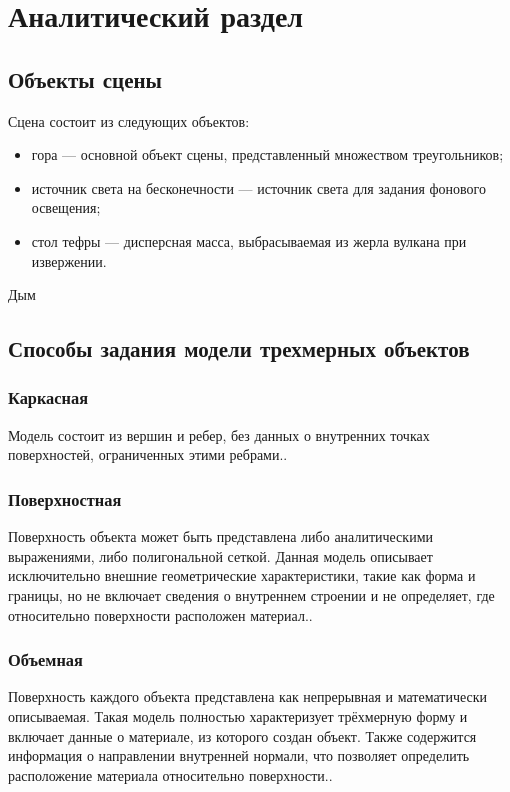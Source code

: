 \chapter{Аналитический раздел}
\section{Объекты сцены}
Сцена состоит из следующих объектов:
\begin{itemize}
	\item гора --- основной объект сцены, представленный множеством треугольников;
	\item источник света на бесконечности --- источник света для задания фонового освещения;
	\item стол тефры --- дисперсная масса, выбрасываемая из жерла вулкана при извержении.
\end{itemize}
Дым
\section{Способы задания модели трехмерных объектов}

\subsection{Каркасная}
Модель состоит из вершин и ребер, без данных о внутренних точках поверхностей, ограниченных этими ребрами.\cite{lit2}.

\subsection{Поверхностная}
Поверхность объекта может быть представлена либо аналитическими выражениями, либо полигональной сеткой. Данная модель описывает исключительно внешние геометрические характеристики, такие как форма и границы, но не включает сведения о внутреннем строении и не определяет, где относительно поверхности расположен материал.\cite{lit2}.

\subsection{Объемная}
Поверхность каждого объекта представлена как непрерывная и математически описываемая. Такая модель полностью характеризует трёхмерную форму и включает данные о материале, из которого создан объект. Также содержится информация о направлении внутренней нормали, что позволяет определить расположение материала относительно поверхности.\cite{lit2}.


